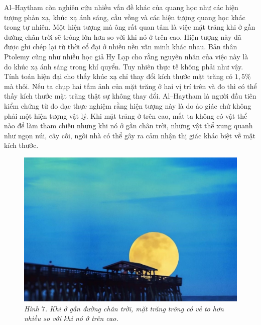 \begin{multicols}{2}
\begin{figure}[H]
	\end{figure}
	Al--Haytham còn nghiên cứu nhiều vấn đề khác của quang học như các hiện tượng phản xạ, khúc xạ ánh sáng, cầu vồng và các hiện tượng quang học khác trong tự nhiên. Một hiện tượng mà ông rất quan tâm là việc mặt trăng khi ở gần đường chân trời sẽ trông lớn hơn so với khi nó ở trên cao. Hiện tượng này đã được ghi chép lại từ thời cổ đại ở nhiều nền văn minh khác nhau. Bản thân Ptolemy cũng như nhiều học giả Hy Lạp cho rằng nguyên nhân của việc này là do khúc xạ ánh sáng trong khí quyển. Tuy nhiên thực tế không phải như vậy. Tính toán hiện đại cho thấy khúc xạ chỉ thay đổi kích thước mặt trăng có $1,5\%$ mà thôi. Nếu ta chụp hai tấm ảnh của mặt trăng ở hai vị trí trên và đo thì có thể thấy kích thước mặt trăng thật sự không thay đổi. Al--Haytham là người đầu tiên kiểm chứng từ đo đạc thực nghiệm rằng hiện tượng này là do ảo giác chứ không phải một hiện tượng vật lý. Khi mặt trăng ở trên cao, mắt ta không có vật thể nào để làm tham chiếu nhưng khi nó ở gần chân trời, những vật thể xung quanh như ngọn núi, cây cối, ngôi nhà có thể gây ra cảm nhận thị giác khác biệt về mặt kích thước.
	\begin{figure}[H]
		\vspace*{-5pt}
		\centering
		\captionsetup{labelformat= empty, justification=centering}
		\includegraphics[width= 1\linewidth]{8}
		\caption{\small\textit{\color{lichsutoanhoc}Hình $7$. Khi ở gần đường chân trời, mặt trăng trông có vẻ to hơn nhiều so với khi nó ở trên cao.}}
		\vspace*{-10pt}
	\end{figure}

\end{multicols}
